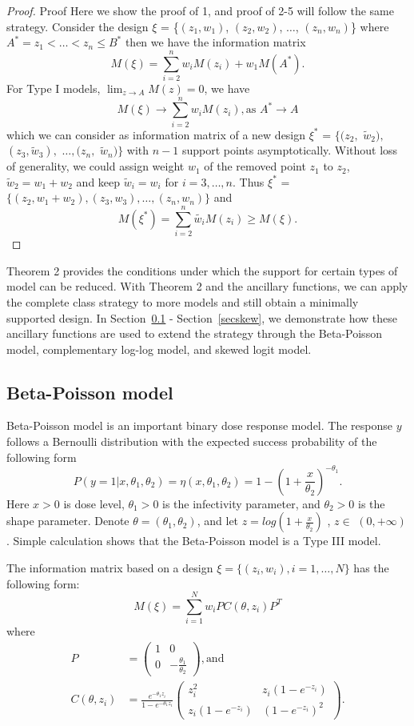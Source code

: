 \documentclass[12pt]{TD-CJS}
\begin{document}
\begin{proof}{Proof}{}
Here we show the proof of 1, and proof of 2-5 will follow the same strategy. Consider the design $\xi$ = \{$(z_1,w_1)$, $(z_2,w_2)$, $\ldots$, $(z_n,w_n)$\} where $A^* = z_1< \ldots< z_n \le B^*$ then we have the information matrix \[M(\xi) =\sum_{i=2}^{n} w_iM(z_i)+w_1M(A^*). \] 
For Type I models,  $\lim_{z\to A}M(z)=0$, we have 
\[
M(\xi) \to\sum_{i=2}^{n} w_iM(z_i),  \text{as } A^* \to A\] which we can consider as information matrix of a new design $\xi^*$ =  $\{(z_2, $ $\tilde{w}_2),$ $ (z_3, \tilde{w}_3),$ $\ldots,(z_{n},$ $\tilde{w}_n) \}$ with $n-1$ support points asymptotically. Without loss of generality, we could assign weight $w_1$ of the removed point $z_1$ to $z_2$, $\tilde{w}_2 = w_1+w_2$ and keep $\tilde{w}_i = w_i$ for $i=3,\ldots,n$. Thus $\xi^*$ =  $\{(z_2, w_1+w_2), (z_3, w_3),\ldots,(z_{n},w_n) \}$ and\[ M(\xi^*) =  \sum_{i=2}^{n} \tilde{w_i}M(z_i)\ge M(\xi).\]

\end{proof}

Theorem 2 provides the conditions under which the support for certain types of model can be reduced. With Theorem 2 and the ancillary functions, we can apply the complete class strategy to more models and still obtain a minimally supported design. In Section~\ref{secbeta} - Section~\ref{secskew}, we demonstrate how these ancillary functions are used to extend the strategy through the Beta-Poisson model, complementary log-log model, and skewed logit model.

 





\subsection{Beta-Poisson model}\label{secbeta}
Beta-Poisson model is an important binary dose response model. The response $y$ follows a Bernoulli distribution with the expected success probability of the following form
\[
P(y=1|x,\theta_1,\theta_2) = \eta(x,\theta_1,\theta_2)= 1-(1+\frac{x}{\theta_2})^{-\theta_1}.
\]
 Here $x> 0$ is dose level, $\theta_1>0$ is the infectivity parameter, and $\theta_2>0$ is the shape parameter. Denote $\theta = (\theta_1,\theta_2)$, and let $z = log(1+\frac{x}{\theta_2})$ , $z\in$ $(0,+\infty)$. Simple calculation shows that the Beta-Poisson model is a Type III model. 
 
 The information matrix based on a design $\xi = \{(z_i,w_i), i=1,\ldots,N\}$ has the following form: \[
M(\xi) = \sum_{i=1}^{N} w_iP C(\theta,z_i)P^T 
\] where \begin{align*}
    P &= \left( \begin{array}{cc}
1 & 0\\
0 & -\frac{\theta_1}{\theta_2}
\end{array} \right), \text{and}\\ 
C(\theta,z_i) &= \frac{e^{-\theta_1z_i}}{1-e^{-\theta_1z_i}}\left( \begin{array}{cc}
z_i^2 & z_i(1-e^{-z_i})\\
z_i(1-e^{-z_i}) & (1-e^{-z_i})^2
\end{array} \right).
\end{align*} 
\end{document}
